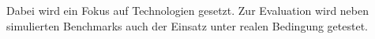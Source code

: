 Dabei wird ein Fokus auf \pTp Technologien gesetzt. Zur Evaluation wird neben simulierten Benchmarks auch der Einsatz unter realen Bedingung getestet.  

%
%
%
%
